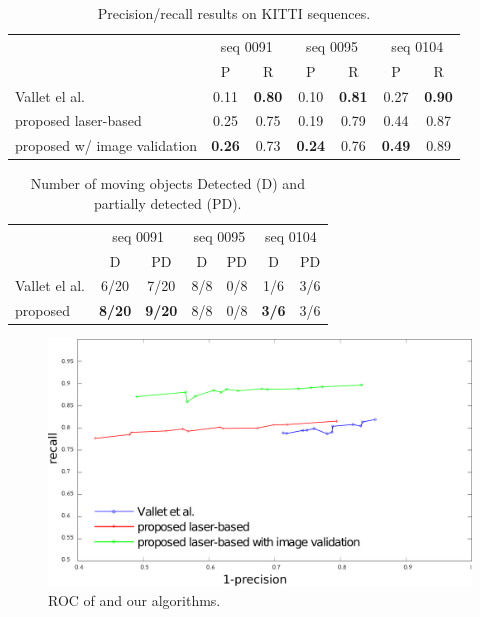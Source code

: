 \begin{table}[t]
\caption{Precision/recall results on KITTI sequences.}
\label{tab:resPR}
\centering
\setlength{\tabcolsep}{3px}
\begin{tabular}{lcccccc}
\toprule                                                                                
&\multicolumn{2}{c}{seq 0091}&\multicolumn{2}{c}{seq 0095}&\multicolumn{2}{c}{seq 0104}\\
&P & R &P & R &P & R \\
\midrule
Vallet el al. \cite{vallet2015extracting}       &       0.11&\textbf{0.80}      &       0.10&\textbf{0.81}      & 0.27&\textbf{0.90}\\
proposed laser-based                            &   0.25&0.75   &  0.19&0.79    & 0.44&0.87\\
proposed w/ image validation                            &       \textbf{0.26}&0.73      &  \textbf{0.24}&0.76   & \textbf{0.49}&0.89\\
\end{tabular}
\end{table}


\begin{table}[t]
\caption{Number of  moving objects Detected (D) and partially detected (PD).}
\label{tab:numPRobj}
\centering
\begin{tabular}{lcccccc}
\toprule 
&\multicolumn{2}{c}{seq 0091}&\multicolumn{2}{c}{seq 0095}&\multicolumn{2}{c}{seq 0104}\\
&D & PD &D & PD &D & PD \\
\midrule
Vallet el al. \cite{vallet2015extracting}       & 6/20  & 7/20  & 8/8 &   0/8   &    1/6        & 3/6\\
proposed & \textbf{8/20}        & \textbf{9/20} & 8/8 &   0/8   &    \textbf{3/6}       & 3/6 \\
\end{tabular}
\end{table}

\begin{figure}[t]
\centering
\includegraphics[width=0.98\columnwidth]{./img/ch-laser/graphres3}
\caption{ROC of  \cite{vallet2015extracting} and our algorithms.}
\label{fig:roc}
\end{figure}

